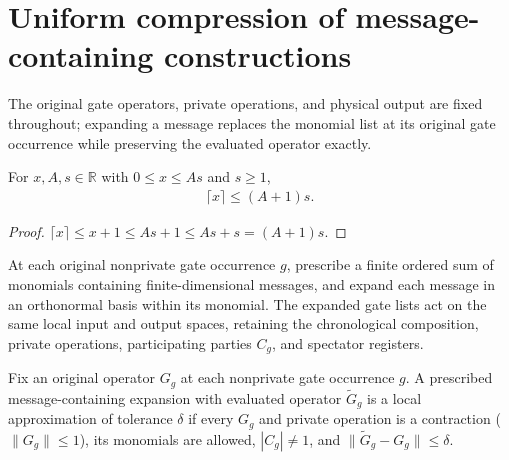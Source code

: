 \section{Uniform compression of message-containing constructions}
\label{sec:peps_uniform_message_density}

The original gate operators, private operations, and physical output are fixed throughout; expanding a message replaces the monomial list at its original gate occurrence while preserving the evaluated operator exactly.

\begin{lemma}
    \label{thm:homogeneous_ceiling_bound}
    \leanok
    For $x,A,s\in\mathbb R$ with $0\le x\le As$ and $s\ge1$,
    \begin{align}
        \lceil x\rceil\le(A+1)s.
        \label{eq:homogeneous_ceiling_bound}
    \end{align}
\end{lemma}
\begin{proof}
    \leanok
    $\lceil x\rceil\le x+1\le As+1\le As+s=(A+1)s$.
\end{proof}

\begin{definition}
    \label{def:peps_message_gate_lists}
    \leanok
    At each original nonprivate gate occurrence $g$, prescribe a finite ordered sum of monomials containing finite-dimensional messages, and expand each message in an orthonormal basis within its monomial. The expanded gate lists act on the same local input and output spaces, retaining the chronological composition, private operations, participating parties $C_g$, and spectator registers.
\end{definition}

\begin{definition}
    \label{def:peps_message_gate_approximation}
    \leanok
    Fix an original operator $G_g$ at each nonprivate gate occurrence $g$. A prescribed message-containing expansion with evaluated operator $\widetilde G_g$ is a local approximation of tolerance $\delta$ if every $G_g$ and private operation is a contraction ($\|G_g\|\le1$), its monomials are allowed, $|C_g|\ne1$, and $\|\widetilde G_g-G_g\|\le\delta$.
\end{definition}

